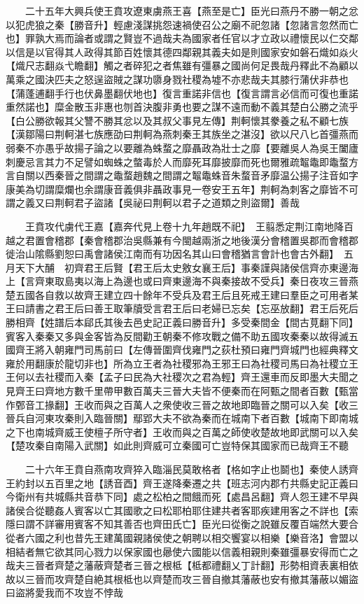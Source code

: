 　　二十五年大興兵使王賁攻遼東虜燕王喜【燕至是亡】臣光曰燕丹不勝一朝之忿以犯虎狼之秦【勝音升】輕慮淺謀挑怨速禍使召公之廟不祀忽諸【忽諸言忽然而亡也】罪孰大焉而論者或謂之賢豈不過哉夫為國家者任官以才立政以禮懷民以仁交鄰以信是以官得其人政得其節百姓懷其德四鄰親其義夫如是則國家安如磐石熾如焱火【熾尺志翻焱弋瞻翻】觸之者碎犯之者焦雖有彊暴之國尚何足畏哉丹釋此不為顧以萬乘之國決匹夫之怒逞盜賊之謀功隳身戮社稷為墟不亦悲哉夫其膝行蒲伏非恭也【蒲蓬逋翻手行也伏鼻墨翻伏地也】復言重諾非信也【復言謂言必信而可復也重諾重然諾也】糜金散玉非惠也刎首決腹非勇也要之謀不遠而動不義其楚白公勝之流乎【白公勝欲報其父讐不勝其忿以及其叔父事見左傳】荆軻懷其豢養之私不顧七族【漢鄒陽曰荆軻湛七族應劭曰荆軻為燕刺秦王其族坐之湛沒】欲以尺八匕首彊燕而弱秦不亦愚乎故揚子論之以要離為蛛蝥之靡聶政為壯士之靡【要離吳人為吳王闔廬刺慶忌言其力不足譬如蜘蛛之螫毒於人而靡死耳靡披靡而死也爾雅疏鼅鼄即鼄蝥方言自關以西秦晉之間謂之鼄蝥趙魏之間謂之鼅鼄蛛音朱蝥音矛靡温公揚子注音如字康美為切謂糜爛也余謂康音義俱非聶政事見一卷安王五年】荆軻為刺客之靡皆不可謂之義又曰荆軻君子盜諸【吳祕曰荆軻以君子之道類之則盜爾】善哉

　　王賁攻代虜代王嘉【嘉奔代見上卷十九年趙既不祀】　王翦悉定荆江南地降百越之君置會稽郡【秦會稽郡治吳縣兼有今閩越兩浙之地後漢分會稽置吳郡而會稽郡徙治山隂縣劉恕曰禹會諸侯江南而有功因名其山曰會稽猶言會計也會古外翻】　五月天下大酺　初齊君王后賢【君王后太史敫女襄王后】事秦謹與諸侯信齊亦東邊海上【言齊東取島夷以海上為邊也或曰齊東邊海不與秦接故不受兵】秦日夜攻三晉燕楚五國各自救以故齊王建立四十餘年不受兵及君王后且死戒王建曰羣臣之可用者某王曰請書之君王后曰善王取筆牘受言君王后曰老婦已忘矣【忘巫放翻】君王后死后勝相齊【姓譜后本郈氏其後去邑史記正義曰勝音升】多受秦間金【間古莧翻下同】賓客入秦秦又多與金客皆為反間勸王朝秦不修攻戰之備不助五國攻秦秦以故得滅五國齊王將入朝雍門司馬前曰【左傳晉圍齊伐雍門之荻杜預曰雍門齊城門也經典釋文雍於用翻康於龍切非也】所為立王者為社稷邪為王邪王曰為社稷司馬曰為社稷立王王何以去社稷而入秦【孟子曰民為大社稷次之君為輕】齊王還車而反即墨大夫聞之見齊王曰齊地方數千里帶甲數百萬夫三晉大夫皆不便秦而在阿甄之間者百數【甄當作鄄音工掾翻】王收而與之百萬人之衆使收三晉之故地即臨晉之關可以入矣【收三晉兵自河東攻秦則入臨晉關】鄢郢大夫不欲為秦而在城南下者百數【城南下即南城之下也南城齊威王使檀子所守者】王收而與之百萬之師使收楚故地即武關可以入矣【楚攻秦自南陽入武關】如此則齊威可立秦國可亡豈特保其國家而已哉齊王不聽

　　二十六年王賁自燕南攻齊猝入臨淄民莫敢格者【格如字止也鬬也】秦使人誘齊王約封以五百里之地【誘音酉】齊王遂降秦遷之共【班志河内郡冇共縣史記正義曰今衛州有共城縣共音恭下同】處之松柏之間餓而死【處昌呂翻】齊人怨王建不早與諸侯合從聽姦人賓客以亡其國歌之曰松耶柏耶住建共者客耶疾建用客之不詳也【索隱曰謂不詳審用賓客不知其善否也齊田氏亡】臣光曰從衡之說雖反覆百端然大要合從者六國之利也昔先王建萬國親諸侯使之朝聘以相交饗宴以相樂【樂音洛】會盟以相結者無它欲其同心戮力以保家國也曏使六國能以信義相親則秦雖彊暴安得而亡之哉夫三晉者齊楚之藩蔽齊楚者三晉之根柢【柢都禮翻乂丁計翻】形勢相資表裏相依故以三晉而攻齊楚自絶其根柢也以齊楚而攻三晉自撤其藩蔽也安有撤其藩蔽以媚盜曰盜將愛我而不攻豈不悖哉


